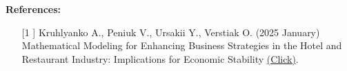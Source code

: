 \documentclass[a4paper,12pt]{article}
\begin{document}
\newpage
\noindent
    \textbf{References:} 
    \begin{enumerate}
        \item[[1]] Kruhlyanko A., Peniuk V., Ursakii Y., Verstiak O. (2025 January) 
        Mathematical Modeling for Enhancing Business Strategies in the Hotel and Restaurant Industry: Implications for Economic 
        Stability \href{https://doi.org/10.52783/anvi.v28.3066}{(Click)}.
    \end{enumerate}
\end{document}
